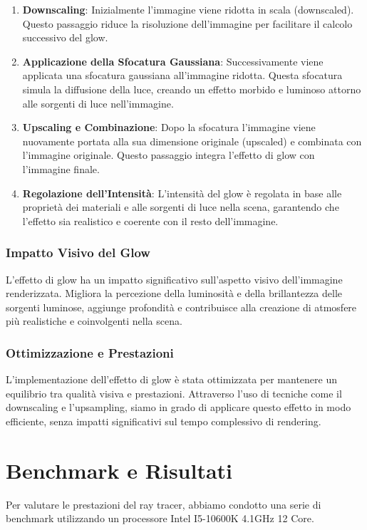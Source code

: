 \documentclass[12pt]{article}
\begin{document}
\begin{enumerate}
\item \textbf{Downscaling}: Inizialmente l'immagine viene ridotta in scala (downscaled). Questo passaggio riduce la risoluzione dell'immagine per facilitare il calcolo successivo del glow.

\item \textbf{Applicazione della Sfocatura Gaussiana}: Successivamente viene applicata una sfocatura gaussiana all'immagine ridotta. Questa sfocatura simula la diffusione della luce, creando un effetto morbido e luminoso attorno alle sorgenti di luce nell'immagine.

\item \textbf{Upscaling e Combinazione}: Dopo la sfocatura l'immagine viene nuovamente portata alla sua dimensione originale (upscaled) e combinata con l'immagine originale. Questo passaggio integra l'effetto di glow con l'immagine finale.

\item \textbf{Regolazione dell'Intensità}: L'intensità del glow è regolata in base alle proprietà dei materiali e alle sorgenti di luce nella scena, garantendo che l'effetto sia realistico e coerente con il resto dell'immagine.
\end{enumerate}

\subsubsection{Impatto Visivo del Glow}
L'effetto di glow ha un impatto significativo sull'aspetto visivo dell'immagine renderizzata. Migliora la percezione della luminosità e della brillantezza delle sorgenti luminose, aggiunge profondità e contribuisce alla creazione di atmosfere più realistiche e coinvolgenti nella scena.

\subsubsection{Ottimizzazione e Prestazioni}
L'implementazione dell'effetto di glow è stata ottimizzata per mantenere un equilibrio tra qualità visiva e prestazioni. Attraverso l'uso di tecniche come il downscaling e l'upsampling, siamo in grado di applicare questo effetto in modo efficiente, senza impatti significativi sul tempo complessivo di rendering.
\newpage


\section{Benchmark e Risultati}
Per valutare le prestazioni del ray tracer, abbiamo condotto una serie di benchmark utilizzando un processore Intel I5-10600K 4.1GHz 12 Core.
\end{document}
